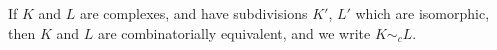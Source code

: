 If $K$ and $L$ are complexes, and have subdivisions $K'$, $L'$ which are isomorphic, then $K$ and $L$ are combinatorially equivalent, and we write $K \sim_c L$.
